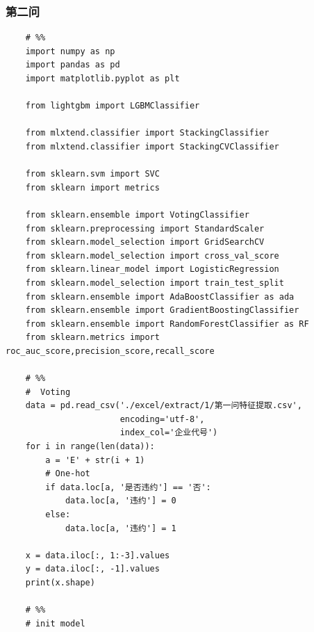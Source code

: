 \documentclass[UTF8]{ctexart}
\begin{document}
\subsubsection{第二问}
\lstset{language=python}
\begin{lstlisting}
	# %%
	import numpy as np
	import pandas as pd
	import matplotlib.pyplot as plt
	
	from lightgbm import LGBMClassifier
	
	from mlxtend.classifier import StackingClassifier
	from mlxtend.classifier import StackingCVClassifier
	
	from sklearn.svm import SVC
	from sklearn import metrics
	
	from sklearn.ensemble import VotingClassifier
	from sklearn.preprocessing import StandardScaler
	from sklearn.model_selection import GridSearchCV
	from sklearn.model_selection import cross_val_score
	from sklearn.linear_model import LogisticRegression
	from sklearn.model_selection import train_test_split
	from sklearn.ensemble import AdaBoostClassifier as ada
	from sklearn.ensemble import GradientBoostingClassifier
	from sklearn.ensemble import RandomForestClassifier as RF
	from sklearn.metrics import roc_auc_score,precision_score,recall_score
	
	# %%
	#  Voting
	data = pd.read_csv('./excel/extract/1/第一问特征提取.csv',
					   encoding='utf-8',
					   index_col='企业代号')
	for i in range(len(data)):
		a = 'E' + str(i + 1)
		# One-hot
		if data.loc[a, '是否违约'] == '否':
			data.loc[a, '违约'] = 0
		else:
			data.loc[a, '违约'] = 1
	
	x = data.iloc[:, 1:-3].values
	y = data.iloc[:, -1].values
	print(x.shape)
	
	# %%
	# init model
	

\end{lstlisting}
\end{document}
